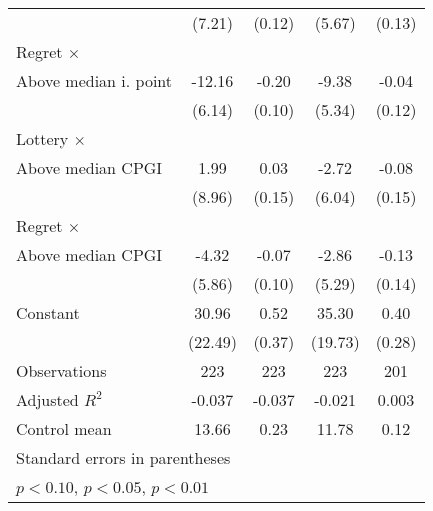 \begin{table}[htbp]
\begin{tabular}{l*{4}{c}}
                &   (7.21)         &   (0.12)         &   (5.67)         &   (0.13)         \\
\addlinespace
Regret $\times$ \\ Above median i. point&   -12.16\sym{**} &    -0.20\sym{**} &    -9.38\sym{*}  &    -0.04         \\
                &   (6.14)         &   (0.10)         &   (5.34)         &   (0.12)         \\
\addlinespace
Lottery $\times$ \\ Above median CPGI&     1.99         &     0.03         &    -2.72         &    -0.08         \\
                &   (8.96)         &   (0.15)         &   (6.04)         &   (0.15)         \\
\addlinespace
Regret $\times$ \\ Above median CPGI&    -4.32         &    -0.07         &    -2.86         &    -0.13         \\
                &   (5.86)         &   (0.10)         &   (5.29)         &   (0.14)         \\
\addlinespace
Constant        &    30.96         &     0.52         &    35.30\sym{*}  &     0.40         \\
                &  (22.49)         &   (0.37)         &  (19.73)         &   (0.28)         \\
\midrule
Observations    &      223         &      223         &      223         &      201         \\
Adjusted \(R^{2}\)&   -0.037         &   -0.037         &   -0.021         &    0.003         \\
Control mean    &    13.66         &     0.23         &    11.78         &     0.12         \\
\bottomrule
\multicolumn{5}{l}{\footnotesize Standard errors in parentheses}\\
\multicolumn{5}{l}{\footnotesize \sym{*} \(p<0.10\), \sym{**} \(p<0.05\), \sym{***} \(p<0.01\)}\\
\end{tabular}
\end{table}

